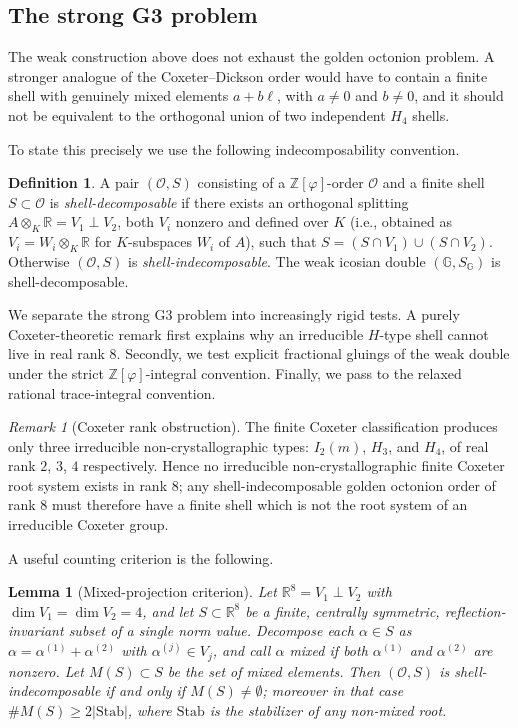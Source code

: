 \documentclass[12pt,oneside,english]{amsart}
\numberwithin{equation}{section}
\numberwithin{figure}{section}
\numberwithin{table}{section}
\theoremstyle{plain}
\newtheorem{lemma}[theorem]{Lemma}
\theoremstyle{definition}
\newtheorem{definition}[theorem]{Definition}
\theoremstyle{remark}
\newtheorem{remark}[theorem]{Remark}
\newcommand{\RR}{\mathbb R}
\newcommand{\Zphi}{\mathbb Z[\varphi]}
\begin{document}
\subsection{The strong G3 problem}

The weak construction above does not exhaust the golden octonion problem. A stronger analogue of the Coxeter--Dickson order would have to contain a finite shell with genuinely mixed elements \(a+b\ell\), with \(a\neq0\) and \(b\neq0\), and it should not be equivalent to the orthogonal union of two independent \(H_4\) shells.

To state this precisely we use the following indecomposability convention.

\begin{definition}
\label{def:indecomposable}
A pair \((\mathcal O,S)\) consisting of a \(\Zphi\)-order \(\mathcal O\) and a finite shell \(S\subset\mathcal O\) is \emph{shell-decomposable} if there exists an orthogonal splitting \(A\otimes_K\RR=V_1\perp V_2\), both \(V_i\) nonzero and defined over \(K\) (i.e., obtained as \(V_i=W_i\otimes_K\RR\) for \(K\)-subspaces \(W_i\) of \(A\)), such that \(S=(S\cap V_1)\cup(S\cap V_2)\). Otherwise \((\mathcal O,S)\) is \emph{shell-indecomposable}. The weak icosian double \((\mathbb G,S_{\mathbb G})\) is shell-decomposable.
\end{definition}

We separate the strong G3 problem into increasingly rigid tests. A purely Coxeter-theoretic remark first explains why an irreducible \(H\)-type shell cannot live in real rank \(8\). Secondly, we test explicit fractional gluings of the weak double under the strict \(\Zphi\)-integral convention. Finally, we pass to the relaxed rational trace-integral convention.

\begin{remark}[Coxeter rank obstruction]
\label{rem:coxeter-rank}
The finite Coxeter classification \cite{Humphreys} produces only three irreducible non-crystallographic types: \(I_2(m)\), \(H_3\), and \(H_4\), of real rank \(2\), \(3\), \(4\) respectively. Hence no irreducible non-crystallographic finite Coxeter root system exists in rank \(8\); any shell-indecomposable golden octonion order of rank \(8\) must therefore have a finite shell which is not the root system of an irreducible Coxeter group.
\end{remark}

A useful counting criterion is the following.

\begin{lemma}[Mixed-projection criterion]
\label{lem:mixed-projection}
Let \(\RR^{8}=V_{1}\perp V_{2}\) with \(\dim V_{1}=\dim V_{2}=4\), and let \(S\subset\RR^{8}\) be a finite, centrally symmetric, reflection-invariant subset of a single norm value. Decompose each \(\alpha\in S\) as \(\alpha=\alpha^{(1)}+\alpha^{(2)}\) with \(\alpha^{(j)}\in V_{j}\), and call \(\alpha\) \emph{mixed} if both \(\alpha^{(1)}\) and \(\alpha^{(2)}\) are nonzero. Let \(M(S)\subset S\) be the set of mixed elements. Then \((\mathcal{O},S)\) is shell-indecomposable if and only if \(M(S)\neq\emptyset\); moreover in that case \(\#M(S)\geq 2|\mathrm{Stab}|\), where \(\mathrm{Stab}\) is the stabilizer of any non-mixed root.
\end{lemma}
\end{document}
